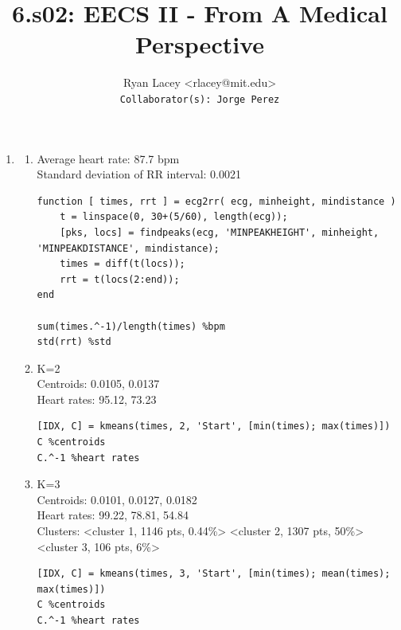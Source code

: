 \documentclass{article}
\begin{document}

\title{6.s02: EECS II - From A Medical Perspective}
\author{
  Ryan Lacey <rlacey@mit.edu>\\
  \footnotesize \texttt{Collaborator(s): Jorge Perez}
}
        
\maketitle
        


\begin{enumerate}
\item[1.]
	\begin{enumerate}
	\item[(a)]
		Average heart rate: 87.7 bpm\\
		Standard deviation of RR interval: 0.0021\\
\begin{lstlisting}   
function [ times, rrt ] = ecg2rr( ecg, minheight, mindistance )
    t = linspace(0, 30+(5/60), length(ecg));
    [pks, locs] = findpeaks(ecg, 'MINPEAKHEIGHT', minheight, 'MINPEAKDISTANCE', mindistance);
    times = diff(t(locs));
    rrt = t(locs(2:end));
end

sum(times.^-1)/length(times) %bpm
std(rrt) %std
\end{lstlisting}

\bigskip

	\item[(b)]
		K=2\\
		Centroids: 0.0105, 0.0137\\
		Heart rates: 95.12, 73.23\\
\begin{lstlisting}   
[IDX, C] = kmeans(times, 2, 'Start', [min(times); max(times)])
C %centroids
C.^-1 %heart rates
\end{lstlisting}

\bigskip

	\item[(c)]
		K=3\\
		Centroids: 0.0101, 0.0127, 0.0182\\
		Heart rates: 99.22, 78.81, 54.84\\
		Clusters: <cluster 1, 1146 pts, 0.44\%> <cluster 2, 1307 pts, 50\%> <cluster 3, 106 pts, 6\%>\\
\begin{lstlisting}   
[IDX, C] = kmeans(times, 3, 'Start', [min(times); mean(times); max(times)])
C %centroids
C.^-1 %heart rates
\end{lstlisting}
	\end{enumerate}


\end{enumerate}
\end{document}
